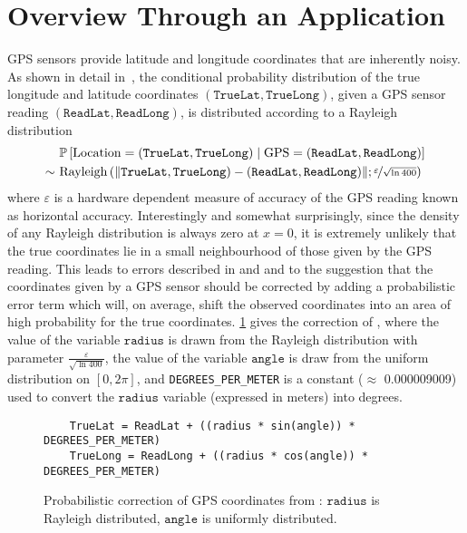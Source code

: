 \section{Overview Through an Application}\label{sec:overview}

GPS sensors provide latitude and longitude  coordinates that are inherently noisy.  As shown in detail in~\cite{bornholt2013abstractions}, the conditional probability distribution of the true longitude and latitude coordinates $(\mathtt{TrueLat}, \mathtt{TrueLong})$,  given a GPS sensor reading $(\mathtt{ReadLat}, \mathtt{ReadLong})$, is distributed according to a Rayleigh distribution
\begin{align*}
 & \mathbb{P}\left[ \mathrm{Location}=(\mathtt{TrueLat}, \mathtt{TrueLong}) \mid \mathrm{GPS}=(\mathtt{ReadLat}, \mathtt{ReadLong})  \right] \\
\sim~ & \mathrm{Rayleigh}\left(\lVert \mathtt{TrueLat}, \mathtt{TrueLong}) - (\mathtt{ReadLat}, \mathtt{ReadLong}) \rVert; \nicefrac{\varepsilon}{\sqrt{\ln 400}}\right)
\end{align*}
where $\varepsilon$ is a hardware dependent measure of accuracy of the GPS reading known as horizontal accuracy.  Interestingly and somewhat surprisingly, since the density of any Rayleigh distribution is always zero at $x=0$,  it is extremely unlikely that the true coordinates lie in a small neighbourhood of those given by the GPS reading.  This leads to errors described in \cite{bornholt2013abstractions} and \cite{bornholt2014uncertain} and to the suggestion that the coordinates given by a GPS sensor should be corrected by adding a probabilistic error term which will, on average, shift the observed coordinates into an area of high probability for the true coordinates. \cref{fig:latitude} gives the correction of \cite{bornholt2014uncertain}, where the value of the variable $\mathtt{radius}$ is drawn from the Rayleigh distribution with parameter $\frac{\varepsilon}{\sqrt{\ln 400}}$, the value of the variable $\mathtt{angle}$ is draw from the uniform distribution on $[0,2\pi]$, and  \texttt{DEGREES\_PER\_METER} is a constant ($\approx$ 0.000009009) used to convert the $\mathtt{radius}$ variable (expressed in meters) into degrees.
\begin{figure}[b]
	\begin{lstlisting}
	TrueLat = ReadLat + ((radius * sin(angle)) * DEGREES_PER_METER)
	TrueLong = ReadLong + ((radius * cos(angle)) * DEGREES_PER_METER)
	\end{lstlisting}
	\caption{Probabilistic correction of GPS coordinates from \cite{bornholt2014uncertain}: $\mathtt{radius}$ is Rayleigh distributed, $\mathtt{angle}$ is uniformly distributed.}\label{fig:latitude}
\end{figure}

